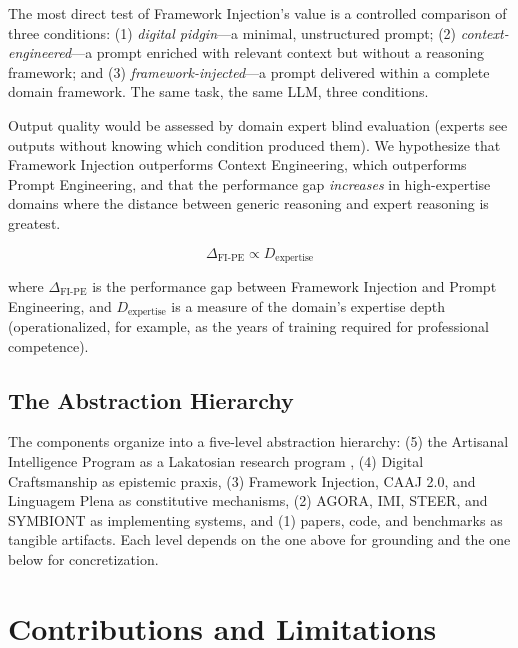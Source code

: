 \documentclass[12pt,a4paper]{article}
\begin{document}
The most direct test of Framework Injection's value is a controlled comparison of three conditions: (1) \emph{digital pidgin}---a minimal, unstructured prompt; (2) \emph{context-engineered}---a prompt enriched with relevant context but without a reasoning framework; and (3) \emph{framework-injected}---a prompt delivered within a complete domain framework. The same task, the same LLM, three conditions.

Output quality would be assessed by domain expert blind evaluation (experts see outputs without knowing which condition produced them). We hypothesize that Framework Injection outperforms Context Engineering, which outperforms Prompt Engineering, and that the performance gap \emph{increases} in high-expertise domains where the distance between generic reasoning and expert reasoning is greatest.

\begin{equation}
\Delta_{\text{FI-PE}} \propto D_{\text{expertise}}
\end{equation}

\noindent where $\Delta_{\text{FI-PE}}$ is the performance gap between Framework Injection and Prompt Engineering, and $D_{\text{expertise}}$ is a measure of the domain's expertise depth (operationalized, for example, as the years of training required for professional competence).

\subsection{The Abstraction Hierarchy}
\label{sec:future:hierarchy}

The components organize into a five-level abstraction hierarchy: (5) the Artisanal Intelligence Program as a Lakatosian research program \citep{lakatos1978}, (4) Digital Craftsmanship as epistemic praxis, (3) Framework Injection, CAAJ 2.0, and Linguagem Plena as constitutive mechanisms, (2) AGORA, IMI, STEER, and SYMBIONT as implementing systems, and (1) papers, code, and benchmarks as tangible artifacts. Each level depends on the one above for grounding and the one below for concretization.


\section{Contributions and Limitations}
\label{sec:contributions}
\end{document}
